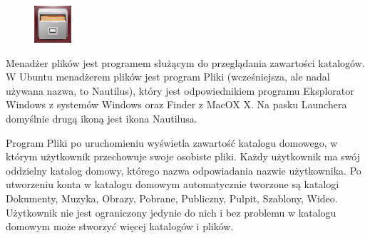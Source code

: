 \begin{figure}
	\vspace{-10pt}
	\includegraphics[width=\linewidth]{images/ikony_pliki.png}
\end{figure}

Menadżer plików jest programem służącym do przeglądania zawartości katalogów. W Ubuntu menadżerem plików jest program  \textcolor{ubuntu_orange}{Pliki} (wcześniejsza, ale nadal używana nazwa, to \textcolor{ubuntu_orange}{Nautilus}), który jest odpowiednikiem programu \textcolor{ubuntu_orange}{Eksplorator Windows} z systemów Windows oraz \textcolor{ubuntu_orange}{Finder} z MacOX X. Na pasku Launchera domyślnie drugą ikoną jest ikona Nautilusa. 

Program Pliki po uruchomieniu wyświetla zawartość katalogu domowego, w którym użytkownik przechowuje swoje osobiste pliki. Każdy użytkownik ma swój oddzielny katalog domowy, którego nazwa odpowiadania nazwie użytkownika. Po utworzeniu konta w katalogu domowym automatycznie tworzone są katalogi Dokumenty, Muzyka, Obrazy, Pobrane, Publiczny, Pulpit, Szablony, Wideo. Użytkownik nie jest ograniczony jedynie do nich i bez problemu w katalogu domowym może stworzyć więcej katalogów i plików.

